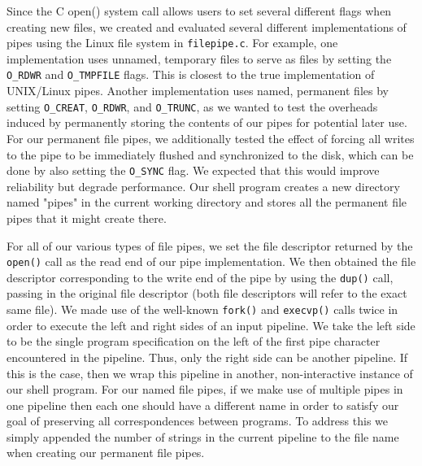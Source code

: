 Since the C open() system call allows users to set several different flags when creating new files, we created and evaluated several different implementations of pipes using the Linux file system in \texttt{filepipe.c}. For example, one implementation uses unnamed, temporary files to serve as files by setting the \texttt{O\_RDWR} and \texttt{O\_TMPFILE} flags. This is closest to the true implementation of UNIX/Linux pipes. Another implementation uses named, permanent files by setting \texttt{O\_CREAT}, \texttt{O\_RDWR}, and \texttt{O\_TRUNC}, as we wanted to test the overheads induced by permanently storing the contents of our pipes for potential later use. For our permanent file pipes, we additionally tested the effect of forcing all writes to the pipe to be immediately flushed and synchronized to the disk, which can be done by also setting the \texttt{O\_SYNC} flag. We expected that this would improve reliability but degrade performance. Our shell program creates a new directory named "pipes" in the current working directory and stores all the permanent file pipes that it might create there.

For all of our various types of file pipes, we set the file descriptor returned by the \texttt{open()} call as the read end of our pipe implementation. We then obtained the file descriptor corresponding to the write end of the pipe by using the \texttt{dup()} call, passing in the original file descriptor (both file descriptors will refer to the exact same file). We made use of the well-known \texttt{fork()} and \texttt{execvp()} calls twice in order to execute the left and right sides of an input pipeline. We take the left side to be the single program specification on the left of the first pipe character encountered in the pipeline. Thus, only the right side can be another pipeline. If this is the case, then we wrap this pipeline in another, non-interactive instance of our shell program. For our named file pipes, if we make use of multiple pipes in one pipeline then each one should have a different name in order to satisfy our goal of preserving all correspondences between programs. To address this we simply appended the number of strings in the current pipeline to the file name when creating our permanent file pipes.

